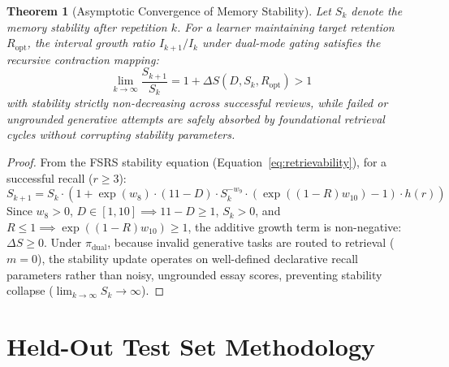 \documentclass[11pt,a4paper]{article}
\newtheorem{theorem}{Theorem}
\begin{document}
\begin{theorem}[Asymptotic Convergence of Memory Stability]
\label{thm:stability}
Let $S_k$ denote the memory stability after repetition $k$. For a learner maintaining target retention $R_{\text{opt}}$, the interval growth ratio $I_{k+1}/I_k$ under dual-mode gating satisfies the recursive contraction mapping:
\begin{equation}
    \lim_{k \to \infty} \frac{S_{k+1}}{S_k} = 1 + \Delta S(D, S_k, R_{\text{opt}}) > 1
\end{equation}
with stability strictly non-decreasing across successful reviews, while failed or ungrounded generative attempts are safely absorbed by foundational retrieval cycles without corrupting stability parameters.
\end{theorem}
\begin{proof}
From the FSRS stability equation (Equation~\ref{eq:retrievability}), for a successful recall ($r \ge 3$):
\begin{equation}
    S_{k+1} = S_k \cdot \left( 1 + \exp(w_8) \cdot (11 - D) \cdot S_k^{-w_9} \cdot (\exp((1 - R)w_{10}) - 1) \cdot h(r) \right)
\end{equation}
Since $w_8 > 0$, $D \in [1, 10] \implies 11 - D \ge 1$, $S_k > 0$, and $R \le 1 \implies \exp((1-R)w_{10}) \ge 1$, the additive growth term is non-negative: $\Delta S \ge 0$. Under $\pi_{\text{dual}}$, because invalid generative tasks are routed to retrieval ($m=0$), the stability update operates on well-defined declarative recall parameters rather than noisy, ungrounded essay scores, preventing stability collapse ($\lim_{k \to \infty} S_k \to \infty$).
\end{proof}

\section{Held-Out Test Set Methodology}
\label{sec:methodology}
\end{document}

